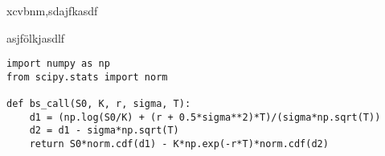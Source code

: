 \begin{tcolorbox}[
  colback=yellow!20,
  colframe=yellow!60!black,
  title={Title},
]
  xcvbnm,sdajfkasdf
\end{tcolorbox}

\begin{tcolorbox}[
  colback=white!10,
  colframe=blue!60,
  title={Title},
]
  asjfölkjasdlf
\end{tcolorbox}

\begin{verbatim}
import numpy as np
from scipy.stats import norm

def bs_call(S0, K, r, sigma, T):
    d1 = (np.log(S0/K) + (r + 0.5*sigma**2)*T)/(sigma*np.sqrt(T))
    d2 = d1 - sigma*np.sqrt(T)
    return S0*norm.cdf(d1) - K*np.exp(-r*T)*norm.cdf(d2)
\end{verbatim}

\begin{tcolorbox}[
  colback=blue!20,
  colframe=blue!60,
  title={Title},
]
  
\end{tcolorbox}
